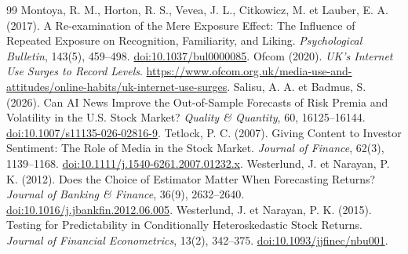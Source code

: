 \documentclass[11pt,a4paper]{article}
\begin{document}
\begin{thebibliography}{99}
 Montoya, R. M., Horton, R. S., Vevea, J. L., Citkowicz, M. et Lauber, E. A. (2017). A Re-examination of the Mere Exposure Effect: The Influence of Repeated Exposure on Recognition, Familiarity, and Liking. \textit{Psychological Bulletin}, 143(5), 459--498. \href{https://doi.org/10.1037/bul0000085}{doi:10.1037/bul0000085}.
 Ofcom (2020). \textit{UK's Internet Use Surges to Record Levels}. \url{https://www.ofcom.org.uk/media-use-and-attitudes/online-habits/uk-internet-use-surges}.
 Salisu, A. A. et Badmus, S. (2026). Can AI News Improve the Out-of-Sample Forecasts of Risk Premia and Volatility in the U.S. Stock Market? \textit{Quality \& Quantity}, 60, 16125--16144. \href{https://doi.org/10.1007/s11135-026-02816-9}{doi:10.1007/s11135-026-02816-9}.
 Tetlock, P. C. (2007). Giving Content to Investor Sentiment: The Role of Media in the Stock Market. \textit{Journal of Finance}, 62(3), 1139--1168. \href{https://doi.org/10.1111/j.1540-6261.2007.01232.x}{doi:10.1111/j.1540-6261.2007.01232.x}.
 Westerlund, J. et Narayan, P. K. (2012). Does the Choice of Estimator Matter When Forecasting Returns? \textit{Journal of Banking \& Finance}, 36(9), 2632--2640. \href{https://doi.org/10.1016/j.jbankfin.2012.06.005}{doi:10.1016/j.jbankfin.2012.06.005}.
 Westerlund, J. et Narayan, P. K. (2015). Testing for Predictability in Conditionally Heteroskedastic Stock Returns. \textit{Journal of Financial Econometrics}, 13(2), 342--375. \href{https://doi.org/10.1093/jjfinec/nbu001}{doi:10.1093/jjfinec/nbu001}.
\end{thebibliography}
\endgroup
\end{document}
